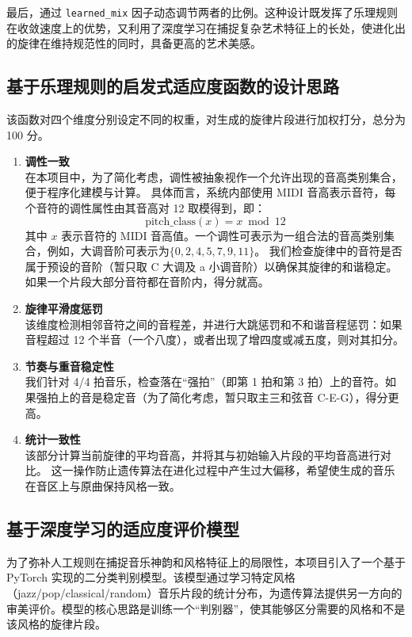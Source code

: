 \documentclass[12pt, a4paper]{ctexart}
\begin{document}
最后，通过 \verb|learned_mix| 因子动态调节两者的比例。这种设计既发挥了乐理规则在收敛速度上的优势，又利用了深度学习在捕捉复杂艺术特征上的长处，使进化出的旋律在维持规范性的同时，具备更高的艺术美感。

\subsection{基于乐理规则的启发式适应度函数的设计思路}
该函数对四个维度分别设定不同的权重，对生成的旋律片段进行加权打分，总分为 100 分。

\begin{enumerate}
    \item \textbf{调性一致} \mbox{} \\
在本项目中，为了简化考虑，调性被抽象视作一个允许出现的音高类别集合，便于程序化建模与计算。
具体而言，系统内部使用 MIDI 音高表示音符，每个音符的调性属性由其音高对 12 取模得到，即：
\begin{equation}
    \text{pitch\_class}(x) = x \bmod 12 \label{eq:pitch}
\end{equation}
其中 \(x\) 表示音符的 MIDI 音高值。一个调性可表示为一组合法的音高类别集合，例如，大调音阶可表示为\(\{0, 2, 4, 5, 7, 9, 11\}\)。
我们检查旋律中的音符是否属于预设的音阶（暂只取 C 大调及 a 小调音阶）以确保其旋律的和谐稳定。如果一个片段大部分音符都在音阶内，得分就高。

    \item \textbf{旋律平滑度惩罚} \mbox{} \\
该维度检测相邻音符之间的音程差，并进行大跳惩罚和不和谐音程惩罚：如果音程超过 12 个半音（一个八度），或者出现了增四度或减五度，则对其扣分。

    \item \textbf{节奏与重音稳定性} \mbox{} \\
我们针对 4/4 拍音乐，检查落在“强拍”（即第 1 拍和第 3 拍）上的音符。如果强拍上的音是稳定音（为了简化考虑，暂只取主三和弦音 C-E-G），得分更高。

    \item \textbf{统计一致性} \mbox{} \\
该部分计算当前旋律的平均音高，并将其与初始输入片段的平均音高进行对比。
这一操作防止遗传算法在进化过程中产生过大偏移，希望使生成的音乐在音区上与原曲保持风格一致。
\end{enumerate}

\subsection{基于深度学习的适应度评价模型}
为了弥补人工规则在捕捉音乐神韵和风格特征上的局限性，本项目引入了一个基于 PyTorch 实现的二分类判别模型。该模型通过学习特定风格（jazz/pop/classical/random）音乐片段的统计分布，为遗传算法提供另一方向的审美评价。模型的核心思路是训练一个“判别器”，使其能够区分需要的风格和不是该风格的旋律片段。
\end{document}
